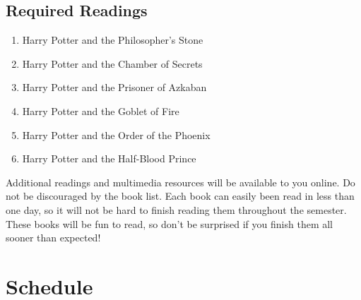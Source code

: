 \documentclass{article}
\begin{document}
\subsection {Required Readings}

\begin{enumerate}
\item Harry Potter and the Philosopher’s Stone
\item Harry Potter and the Chamber of Secrets
\item Harry Potter and the Prisoner of Azkaban
\item Harry Potter and the Goblet of Fire
\item Harry Potter and the Order of the Phoenix
\item Harry Potter and the Half-Blood Prince
\end{enumerate}

Additional readings and multimedia resources will be available to you online.
Do not be discouraged by the book list. Each book can easily been read in less than one day, so it will not be hard to finish reading them throughout the semester. These books will be fun to read, so don’t be surprised if you finish them all sooner than expected!

\newpage
\section{Schedule}
\end{document}
